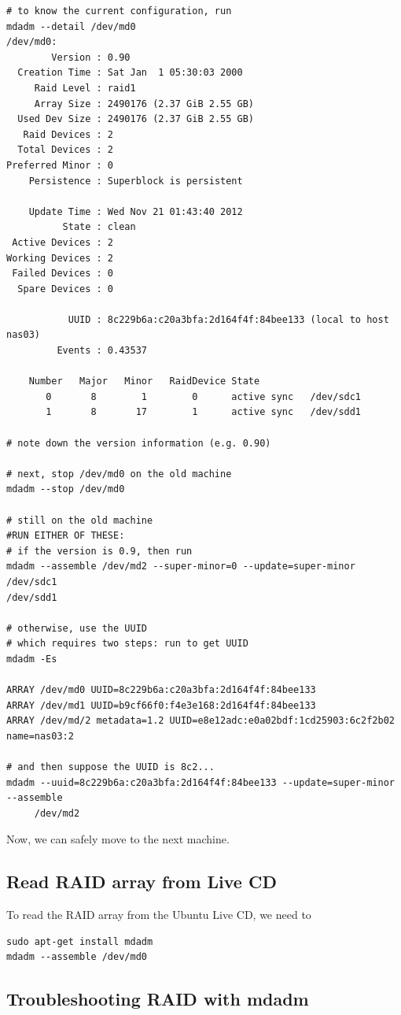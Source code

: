 \begin{verbatim}
# to know the current configuration, run
mdadm --detail /dev/md0
/dev/md0:
        Version : 0.90
  Creation Time : Sat Jan  1 05:30:03 2000
     Raid Level : raid1
     Array Size : 2490176 (2.37 GiB 2.55 GB)
  Used Dev Size : 2490176 (2.37 GiB 2.55 GB)
   Raid Devices : 2
  Total Devices : 2
Preferred Minor : 0
    Persistence : Superblock is persistent
 
    Update Time : Wed Nov 21 01:43:40 2012
          State : clean
 Active Devices : 2
Working Devices : 2
 Failed Devices : 0
  Spare Devices : 0
 
           UUID : 8c229b6a:c20a3bfa:2d164f4f:84bee133 (local to host nas03)
         Events : 0.43537
 
    Number   Major   Minor   RaidDevice State
       0       8        1        0      active sync   /dev/sdc1
       1       8       17        1      active sync   /dev/sdd1

# note down the version information (e.g. 0.90)
       
# next, stop /dev/md0 on the old machine
mdadm --stop /dev/md0

# still on the old machine
#RUN EITHER OF THESE:
# if the version is 0.9, then run
mdadm --assemble /dev/md2 --super-minor=0 --update=super-minor /dev/sdc1
/dev/sdd1

# otherwise, use the UUID
# which requires two steps: run to get UUID
mdadm -Es

ARRAY /dev/md0 UUID=8c229b6a:c20a3bfa:2d164f4f:84bee133
ARRAY /dev/md1 UUID=b9cf66f0:f4e3e168:2d164f4f:84bee133
ARRAY /dev/md/2 metadata=1.2 UUID=e8e12adc:e0a02bdf:1cd25903:6c2f2b02 name=nas03:2

# and then suppose the UUID is 8c2...
mdadm --uuid=8c229b6a:c20a3bfa:2d164f4f:84bee133 --update=super-minor --assemble
     /dev/md2
\end{verbatim}
Now, we can safely move to the next machine.



\subsection{Read RAID array from Live CD}

To read the RAID array from the Ubuntu Live CD, we need to 
\begin{verbatim}
sudo apt-get install mdadm
mdadm --assemble /dev/md0
\end{verbatim}


\subsection{Troubleshooting RAID with mdadm}

